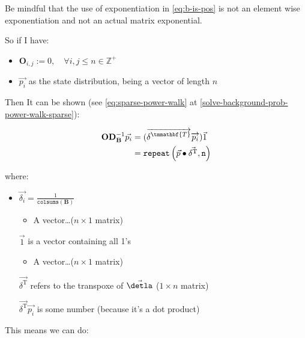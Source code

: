 \documentclass[11pt]{article}
\begin{document}
Be mindful that the use of exponentiation in \eqref{eq:b-is-pos} is not an element wise
exponentiation and not an actual matrix exponential.

So if I have:

\begin{itemize}
\item \(\mathbf{O}_{i, j} := 0, \quad \forall i,j\leq n \in \mathbb{Z}^+\)

\item \(\vec{p_i}\) as the state distribution, being a vector of length \(n\)
\end{itemize}

Then It can be shown (see \eqref{eq:sparse-power-walk} at \ref{solve-background-prob-power-walk-sparse}):

\begin{align}
    \mathbf{O} \mathbf{D}_{\mathbf{B}}^{-1} \vec{p_i} &= (\overrightarrow{\delta^{{\footnotesize \tmmathbf{T}}}}
     \overrightarrow{p_i})  \vec{1}\\
& = \mathtt{repeat} \left(\vec{p} \bullet \vec{\delta^{\tiny \mathrm{T}}} \mathtt{, n} \right) \\
\end{align}



where:

\begin{itemize}
\item \(\vec{\delta_i} = \frac{1}{\mathtt{colsums} \left( \mathbf{B} \right)}\)
\begin{itemize}
\item A vector\ldots{}(\(n\times 1\) matrix)
\end{itemize}
\item[{\(\vec{1}\) }] is a vector containing all 1's
\begin{itemize}
\item A vector\ldots{}(\(n\times 1\) matrix)
\end{itemize}
\item[{\(\vec{\delta^{\mathrm{T}}}\)}] refers to the transpoxe of \(\vec{\detla}\) (\(1\times n\) matrix)
\item[{\(\vec{\delta^{\mathrm{T}}} \vec{p_{i}}\)}] is some number (because it's a dot product)
\end{itemize}

This means we can do:
\end{document}
